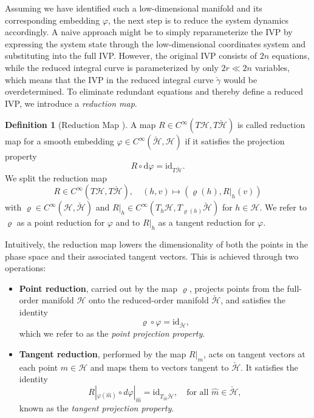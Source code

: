 \documentclass{article}
\theoremstyle{plain}
\theoremstyle{definition}
\newtheorem{definition}[theorem]{Definition}
\theoremstyle{remark}
\begin{document}
Assuming we have identified such a low-dimensional manifold and its corresponding embedding \(\varphi\), the next step is to reduce the system dynamics accordingly. A naive approach might be to simply reparameterize the IVP by expressing the system state through the low-dimensional coordinates system and substituting into the full IVP. However, the original IVP consists of \(2n\) equations, while the reduced integral curve is parameterized by only \(2r \ll 2n\) variables, which means that the IVP in the reduced integral curve \(\check{\gamma}\) would be overdetermined. To eliminate redundant equations and thereby define a reduced IVP, we introduce a \emph{reduction map}.

\begin{definition}[Reduction Map \cite{buchfink2024}]
A map $R \in C^{\infty}(T\mathcal{H}, T\check{\mathcal{H}})$ is called reduction map for a smooth embedding $\varphi \in C^{\infty}(\check{\mathcal{H}}, \mathcal{H})$ if it satisfies the projection property
\begin{equation}
R \circ \mathrm{d}\varphi = \mathrm{id}_{T\check{\mathcal{H}}}.
\end{equation}
We split the reduction map
\begin{equation}
R \in C^{\infty}(T\mathcal{H}, T\check{\mathcal{H}}), \quad (h,v) \mapsto (\varrho(h), R|_h(v))
\end{equation}
with $\varrho \in C^{\infty}(\mathcal{H}, \check{\mathcal{H}})$ and $R|_h \in C^{\infty}(T_h\mathcal{H}, T_{\varrho(h)}\check{\mathcal{H}})$ for $h \in \mathcal{H}$. We refer to $\varrho$ as a point reduction for $\varphi$ and to $R|_h$ as a tangent reduction for $\varphi$.
\end{definition}
Intuitively, the reduction map lowers the dimensionality of both the points in the phase space and their associated tangent vectors. This is achieved through two operations:
\begin{itemize}
    \item \textbf{Point reduction}, carried out by the map \(\varrho\), projects points from the full-order manifold \(\mathcal{H}\) onto the reduced-order manifold \(\check{\mathcal{H}}\), and satisfies the identity
    \[
    \varrho \circ \varphi = \mathrm{id}_{\check{\mathcal{H}}},
    \]
    which we refer to as the \emph{point projection property}.

    \item \textbf{Tangent reduction}, performed by the map \(R|_m\), acts on tangent vectors at each point \(m \in \mathcal{H}\) and maps them to vectors tangent to \(\check{\mathcal{H}}\). It satisfies the identity
    \[
    R|_{\varphi(\hat{m})} \circ d\varphi|_{\hat{m}} = \mathrm{id}_{T_{\hat{m}}\check{\mathcal{H}}},
    \quad \text{for all } \hat{m} \in \check{\mathcal{H}},
    \]
    known as the \emph{tangent projection property}.
\end{itemize}
\end{document}

